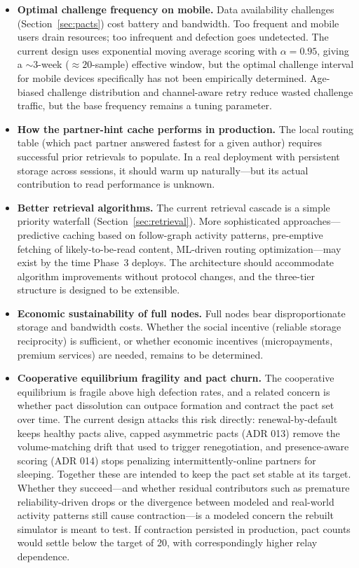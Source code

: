 \documentclass[11pt,a4paper]{article}
\begin{document}
\begin{itemize}
  \item \textbf{Optimal challenge frequency on mobile.} Data availability challenges (Section~\ref{sec:pacts}) cost battery and bandwidth. Too frequent and mobile users drain resources; too infrequent and defection goes undetected. The current design uses exponential moving average scoring with $\alpha = 0.95$, giving a ${\sim}3$-week (${\approx}20$-sample) effective window, but the optimal challenge interval for mobile devices specifically has not been empirically determined. Age-biased challenge distribution and channel-aware retry reduce wasted challenge traffic, but the base frequency remains a tuning parameter.

  \item \textbf{How the partner-hint cache performs in production.} The local routing table (which pact partner answered fastest for a given author) requires successful prior retrievals to populate. In a real deployment with persistent storage across sessions, it should warm up naturally---but its actual contribution to read performance is unknown.

  \item \textbf{Better retrieval algorithms.} The current retrieval cascade is a simple priority waterfall (Section~\ref{sec:retrieval}). More sophisticated approaches---predictive caching based on follow-graph activity patterns, pre-emptive fetching of likely-to-be-read content, ML-driven routing optimization---may exist by the time Phase~3 deploys. The architecture should accommodate algorithm improvements without protocol changes, and the three-tier structure is designed to be extensible.

  \item \textbf{Economic sustainability of full nodes.} Full nodes bear disproportionate storage and bandwidth costs. Whether the social incentive (reliable storage reciprocity) is sufficient, or whether economic incentives (micropayments, premium services) are needed, remains to be determined.

  \item \textbf{Cooperative equilibrium fragility and pact churn.} The cooperative equilibrium is fragile above high defection rates, and a related concern is whether pact dissolution can outpace formation and contract the pact set over time. The current design attacks this risk directly: renewal-by-default keeps healthy pacts alive, capped asymmetric pacts (ADR 013) remove the volume-matching drift that used to trigger renegotiation, and presence-aware scoring (ADR 014) stops penalizing intermittently-online partners for sleeping. Together these are intended to keep the pact set stable at its target. Whether they succeed---and whether residual contributors such as premature reliability-driven drops or the divergence between modeled and real-world activity patterns still cause contraction---is a modeled concern the rebuilt simulator is meant to test. If contraction persisted in production, pact counts would settle below the target of 20, with correspondingly higher relay dependence.


\end{itemize}
\end{document}
